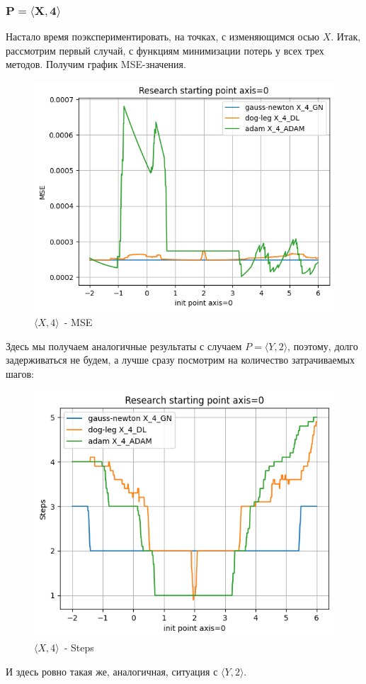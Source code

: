 \documentclass[12pt, a4paper, oneside, final]{article}
\begin{document}
	\subsubsection*{$\mathbf{P = \langle X, 4 \rangle}$}
	Настало время поэкспериментировать, на точках, с изменяющимся осью $X$.
	Итак, рассмотрим первый случай, с функциям минимизации потерь у всех трех методов.
	Получим график MSE-значения.
	\begin{figure}[H]
		\centering
		\includegraphics[scale = 0.55]{Image/T1_X_4_MSE.png}
		\caption*{$\langle X, 4 \rangle$~- MSE}
	\end{figure}
	Здесь мы получаем аналогичные результаты с случаем $P = \langle Y, 2 \rangle$, поэтому, долго задерживаться не будем, а лучше сразу посмотрим на количество затрачиваемых шагов:
	\begin{figure}[H]
		\centering
		\includegraphics[scale = 0.55]{Image/T1_X_4_STEPS.png}
		\caption*{$\langle X, 4 \rangle$~- Steps}
	\end{figure}
	И здесь ровно такая же, аналогичная, ситуация с $\langle Y, 2 \rangle$.
\end{document}
